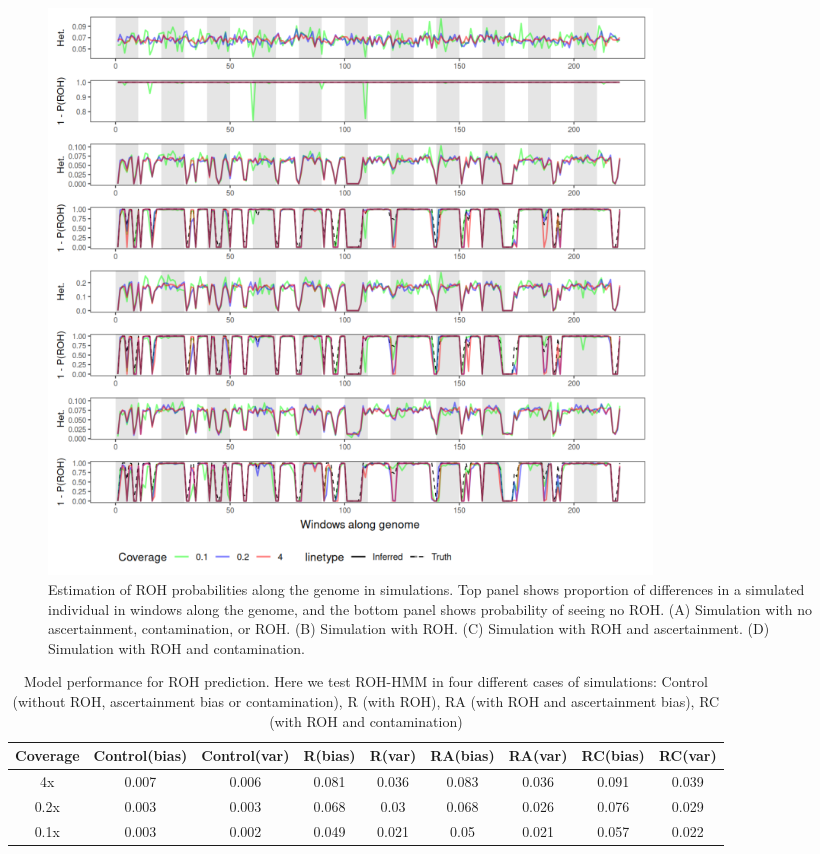 \documentclass[12pt, letterpaper]{article}
\begin{document}
\begin{figure}[h!]
    \includegraphics[width=16cm]{plots/inkscape_finalImg/ROHplot.png}
    \centering
    \caption{Estimation of ROH probabilities along the genome in simulations. Top panel shows proportion of differences in a simulated individual in windows along the genome, and the bottom panel shows probability of seeing no ROH. (A) Simulation with no ascertainment, contamination, or ROH. (B) Simulation with ROH. (C) Simulation with ROH and ascertainment. (D) Simulation with ROH and contamination.}
    \label{fig2:ROH}
\end{figure}

\begin{table}[h!]
\caption{\label{tab:Table 2}Model performance for ROH prediction. Here we test ROH-HMM in four different cases of simulations: Control (without ROH, ascertainment bias or contamination), R (with ROH), RA (with ROH and ascertainment bias), RC (with ROH and contamination)}
\begin{tabular}{|c|c|c|c|c|c|c|c|c|}
    \hline
    Coverage & Control(bias) & Control(var) & R(bias) & R(var) & RA(bias) & RA(var) & RC(bias) & RC(var)\\
    \hline
    4x & 0.007 & 0.006 & 0.081 & 0.036 & 0.083 & 0.036 & 0.091 & 0.039\\
    \hline
    0.2x & 0.003 & 0.003 & 0.068 & 0.03 & 0.068 & 0.026 & 0.076 & 0.029\\
    \hline
    0.1x & 0.003 & 0.002 & 0.049 & 0.021 & 0.05 & 0.021 & 0.057 & 0.022\\
    \hline
\end{tabular}
\label{table1}
\end{table}
\end{document}
